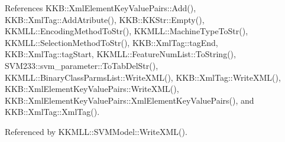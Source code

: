 References K\+K\+B\+::\+Xml\+Element\+Key\+Value\+Pairs\+::\+Add(), K\+K\+B\+::\+Xml\+Tag\+::\+Add\+Atribute(), K\+K\+B\+::\+K\+K\+Str\+::\+Empty(), K\+K\+M\+L\+L\+::\+Encoding\+Method\+To\+Str(), K\+K\+M\+L\+L\+::\+Machine\+Type\+To\+Str(), K\+K\+M\+L\+L\+::\+Selection\+Method\+To\+Str(), K\+K\+B\+::\+Xml\+Tag\+::tag\+End, K\+K\+B\+::\+Xml\+Tag\+::tag\+Start, K\+K\+M\+L\+L\+::\+Feature\+Num\+List\+::\+To\+String(), S\+V\+M233\+::svm\+\_\+parameter\+::\+To\+Tab\+Del\+Str(), K\+K\+M\+L\+L\+::\+Binary\+Class\+Parms\+List\+::\+Write\+X\+M\+L(), K\+K\+B\+::\+Xml\+Tag\+::\+Write\+X\+M\+L(), K\+K\+B\+::\+Xml\+Element\+Key\+Value\+Pairs\+::\+Write\+X\+M\+L(), K\+K\+B\+::\+Xml\+Element\+Key\+Value\+Pairs\+::\+Xml\+Element\+Key\+Value\+Pairs(), and K\+K\+B\+::\+Xml\+Tag\+::\+Xml\+Tag().



Referenced by K\+K\+M\+L\+L\+::\+S\+V\+M\+Model\+::\+Write\+X\+M\+L().


